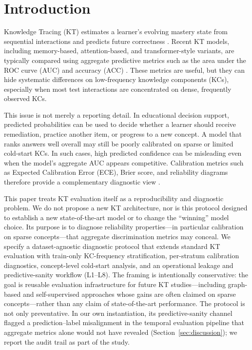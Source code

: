 \section{Introduction}
\label{sec:introduction}
Knowledge Tracing (KT) estimates a learner's evolving mastery state from sequential interactions and predicts future correctness \citep{corbett1994knowledge,piech2015deep,abdelrahman2023knowledge}. Recent KT models, including memory-based, attention-based, and transformer-style variants, are typically compared using aggregate predictive metrics such as the area under the ROC curve (AUC) and accuracy (ACC) \citep{zhang2017dynamic,ghosh2020context,liu2023simplekt}. These metrics are useful, but they can hide systematic differences on low-frequency knowledge components (KCs), especially when most test interactions are concentrated on dense, frequently observed KCs.

This issue is not merely a reporting detail. In educational decision support, predicted probabilities can be used to decide whether a learner should receive remediation, practice another item, or progress to a new concept. A model that ranks answers well overall may still be poorly calibrated on sparse or limited cold-start KCs. In such cases, high predicted confidence can be misleading even when the model's aggregate AUC appears competitive. Calibration metrics such as Expected Calibration Error (ECE), Brier score, and reliability diagrams therefore provide a complementary diagnostic view \citep{guo2017calibration,brier1950verification,degroot1983comparison}.

This paper treats KT evaluation itself as a reproducibility and diagnostic problem. We do not propose a new KT architecture, nor is this protocol designed to establish a new state-of-the-art model or to change the ``winning'' model choice. Its purpose is to diagnose reliability properties---in particular calibration on sparse concepts---that aggregate discrimination metrics may conceal. We specify a dataset-agnostic diagnostic protocol that extends standard KT evaluation with train-only KC-frequency stratification, per-stratum calibration diagnostics, concept-level cold-start analysis, and an operational leakage and predictive-sanity workflow (L1--L8). The framing is intentionally conservative: the goal is reusable evaluation infrastructure for future KT studies---including graph-based and self-supervised approaches whose gains are often claimed on sparse concepts---rather than any claim of state-of-the-art performance. The protocol is not only preventative. In our own instantiation, its predictive-sanity channel flagged a prediction--label misalignment in the temporal evaluation pipeline that aggregate metrics alone would not have revealed (Section~\ref{sec:discussion}); we report the audit trail as part of the study.


